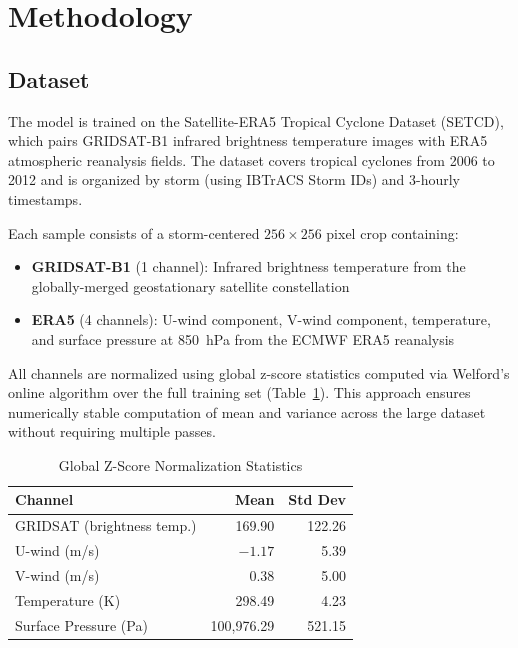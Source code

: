\documentclass[12pt, a4paper]{article}
\begin{document}
\section{Methodology}

\subsection{Dataset}

The model is trained on the Satellite-ERA5 Tropical Cyclone Dataset (SETCD), which pairs GRIDSAT-B1 infrared brightness temperature images with ERA5 atmospheric reanalysis fields. The dataset covers tropical cyclones from 2006 to 2012 and is organized by storm (using IBTrACS Storm IDs) and 3-hourly timestamps.

Each sample consists of a storm-centered $256 \times 256$ pixel crop containing:
\begin{itemize}
\item \textbf{GRIDSAT-B1} (1 channel): Infrared brightness temperature from the globally-merged geostationary satellite constellation \cite{knapp2011gridsat}
\item \textbf{ERA5} (4 channels): U-wind component, V-wind component, temperature, and surface pressure at 850~hPa from the ECMWF ERA5 reanalysis \cite{hersbach2020era5}
\end{itemize}

All channels are normalized using global z-score statistics computed via Welford's online algorithm over the full training set (Table~\ref{tab:normstats}). This approach ensures numerically stable computation of mean and variance across the large dataset without requiring multiple passes.

\begin{table}[H]
\centering
\caption{Global Z-Score Normalization Statistics}
\label{tab:normstats}
\begin{tabular}{lrr}
\toprule
\textbf{Channel} & \textbf{Mean} & \textbf{Std Dev} \\
\midrule
GRIDSAT (brightness temp.) & 169.90 & 122.26 \\
U-wind (m/s) & $-1.17$ & 5.39 \\
V-wind (m/s) & 0.38 & 5.00 \\
Temperature (K) & 298.49 & 4.23 \\
Surface Pressure (Pa) & 100{,}976.29 & 521.15 \\
\bottomrule
\end{tabular}
\end{table}
\end{document}
